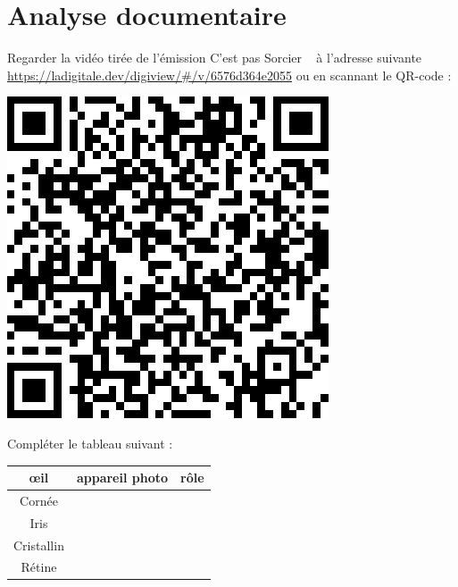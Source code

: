 \section{Analyse documentaire}
\begin{tcolorbox}[colback=orange!5!white,colframe=orange!75!black,title= C'est pas sorcier l'\oe il ! :]
Regarder la vidéo tirée de l'émission \og C'est pas Sorcier \fg~ à l'adresse suivante \url{https://ladigitale.dev/digiview/#/v/6576d364e2055} ou en scannant le QR-code : 
\begin{center}
    \includegraphics[scale=0.4]{Images/TP/TP11/CPasSorcier_Oeil.png}
\end{center}
Compléter le tableau suivant :
\begin{center}
    \begin{tabular}{|C{0.3}|C{0.3}|C{0.3}|}
    \hline
         \oe il &  appareil photo &  rôle \\
        \hline
        Cornée &  & \\
        \hline
        Iris &  & \\
        \hline 
        Cristallin & & \\
        \hline 
        Rétine & & \\
        \hline 
    \end{tabular}
\end{center}

\end{tcolorbox}


